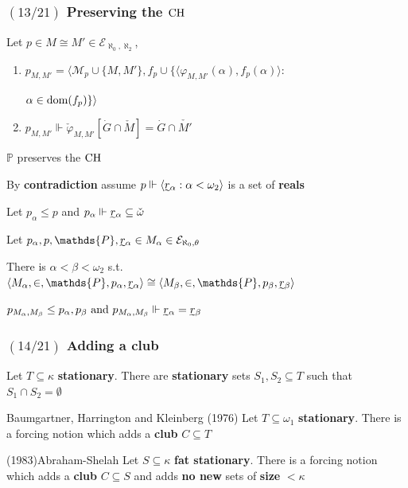 \documentclass{beamer}
\newcommand{\dom}[1]{{\rm{dom}}(#1)}
\newcommand{\p}{\mathds{P}}
\newcommand{\ch}{\rm{CH}}
\newcommand{\op}[2]{\langle #1, #2 \rangle}
\newcommand{\el}[1]{\mathcal{E}_{\aleph_0, #1}}
\begin{document}
\begin{frame}
\frametitle{$(13/21)$ \hspace{15mm} Preserving the $\ch$}
\begin{lemma}
Let $p \in M \cong M' \in \el{\aleph_2}$,
\begin{enumerate}
\item $p_{M,M'}=\op{\mathcal{M}_p \cup \lbrace M, M'\rbrace}{f_p \cup \lbrace \op{\varphi_{M,M'}(\alpha)}{f_p(\alpha)}\colon$

$\alpha \in \dom{f_p}\rbrace}$
\item $p_{M, M'} \Vdash\check{\varphi}_{M, M'}[\dot{G} \cap \check{M}]=\dot{G} \cap \check{M'}$
\end{enumerate}
\end{lemma}
\pause
\begin{lemma}{}
$\p$ preserves the $\ch$
\end{lemma}
\begin{alertblock}{}
By \textbf{contradiction} assume $p \Vdash \langle \undertilde{r}_{\alpha}: \alpha < \omega_2 \rangle$ is a set of \textbf{reals}

Let $p_{\alpha} \leq p$ and $p_{\alpha} \Vdash\undertilde{r}_{\alpha} \subseteq \check{\omega}$

Let $p_{\alpha}, p, \p, \undertilde{r}_{\alpha} \in M_{\alpha} \in \el{\theta}$

There is $\alpha<\beta<\omega_2$ s.t. $\langle M_{\alpha}, \in, \p, p_{\alpha}, \undertilde{r}_{\alpha} \rangle \cong \langle M_{\beta}, \in, \p, p_{\beta}, \undertilde{r}_{\beta} \rangle$

$p_{M_{\alpha}, M_{\beta}} \leq p_{\alpha}, p_{\beta} \text{ and }p_{M_{\alpha}, M_{\beta}} \Vdash \undertilde{r}_{\alpha}=\undertilde{r}_{\beta}$
\end{alertblock}
\end{frame}
\begin{frame}
\frametitle{$(14/21)$ \hspace{20mm} Adding a club}
 \begin{theorem}
Let $T \subseteq \kappa$ \textbf{stationary}. There are \textbf{stationary} sets $S_1, S_2\subseteq T$ such that $S_1 \cap S_2 =\emptyset$
\end{theorem}
\pause
\begin{alertblock}{Baumgartner, Harrington and Kleinberg (1976)}
Let $T \subseteq \omega_1$ \textbf{stationary}. There is a forcing notion which adds a \textbf{club} $C \subseteq T$
\end{alertblock}
\pause
\begin{block}{(1983)Abraham-Shelah}
Let $S \subseteq \kappa$ \textbf{fat stationary}. There is a forcing notion which adds a \textbf{club} $C \subseteq S$ and adds \textbf{no new} sets of \textbf{size} $<\kappa$
\end{block}
\end{frame}
\end{document}

